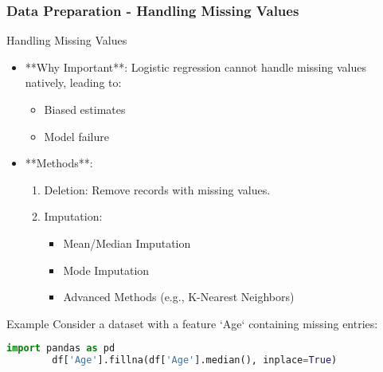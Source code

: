 \documentclass[aspectratio=169]{beamer}
\begin{document}
\begin{frame}[fragile]
    \frametitle{Data Preparation - Handling Missing Values}
    \begin{block}{Handling Missing Values}
        \begin{itemize}
            \item **Why Important**: Logistic regression cannot handle missing values natively, leading to:
            \begin{itemize}
                \item Biased estimates
                \item Model failure
            \end{itemize}

            \item **Methods**:
            \begin{enumerate}
                \item Deletion: Remove records with missing values.
                \item Imputation:
                \begin{itemize}
                    \item Mean/Median Imputation
                    \item Mode Imputation
                    \item Advanced Methods (e.g., K-Nearest Neighbors)
                \end{itemize}
            \end{enumerate}
        \end{itemize}
    \end{block}
    \begin{block}{Example}
        Consider a dataset with a feature `Age` containing missing entries:
        \begin{lstlisting}[language=Python]
        import pandas as pd
        df['Age'].fillna(df['Age'].median(), inplace=True)
        \end{lstlisting}
    \end{block}
\end{frame}
\end{document}
